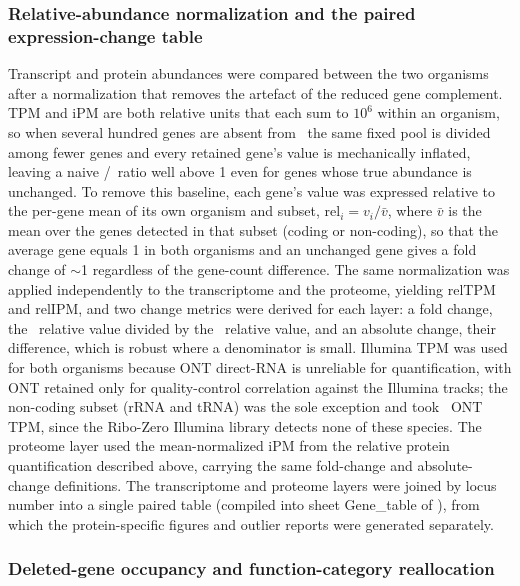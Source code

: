 \subsubsection{Relative-abundance normalization and the paired expression-change table}
\label{method:reduction-normalization}
Transcript and protein abundances were compared between the two organisms after a normalization that removes the artefact of the reduced gene complement.
TPM and iPM are both relative units that each sum to $10^{6}$ within an organism, so when several hundred genes are absent from \syna~the same fixed pool is divided among fewer genes and every retained gene's value is mechanically inflated, leaving a naive \syna/\syn~ratio well above 1 even for genes whose true abundance is unchanged.
To remove this baseline, each gene's value was expressed relative to the per-gene mean of its own organism and subset, $\mathrm{rel}_i = v_i / \bar{v}$, where $\bar{v}$ is the mean over the genes detected in that subset (coding or non-coding), so that the average gene equals 1 in both organisms and an unchanged gene gives a fold change of $\sim$1 regardless of the gene-count difference.
The same normalization was applied independently to the transcriptome and the proteome, yielding relTPM and relIPM, and two change metrics were derived for each layer: a fold change, the \syna~relative value divided by the \syn~relative value, and an absolute change, their difference, which is robust where a denominator is small.
Illumina TPM was used for both organisms because ONT direct-RNA is unreliable for quantification, with ONT retained only for quality-control correlation against the Illumina tracks; the non-coding subset (rRNA and tRNA) was the sole exception and took \syna~ONT TPM, since the Ribo-Zero Illumina library detects none of these species.
The proteome layer used the mean-normalized iPM from the relative protein quantification described above, carrying the same fold-change and absolute-change definitions.
The transcriptome and proteome layers were joined by locus number into a single paired table (compiled into sheet Gene\_table of \sdreduction), from which the protein-specific figures and outlier reports were generated separately.

\subsubsection{Deleted-gene occupancy and function-category reallocation}

